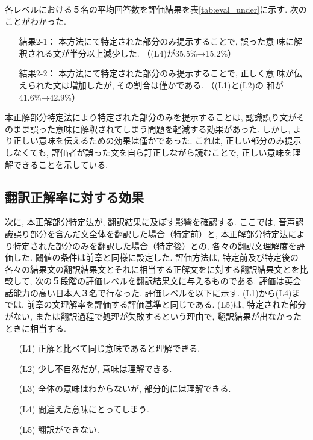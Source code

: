 各レベルにおける５名の平均回答数を評価結果を表\ref{tab:eval_under}に示す. 
次のことがわかった. 
\begin{itemize}
\item [　結果2-1：] 本方法にて特定された部分のみ提示することで, 誤った意
      味に解釈される文が半分以上減少した. （(L4)が35.5\%→15.2\%）
\item [　結果2-2：] 本方法にて特定された部分のみ提示することで, 正しく意
      味が伝えられた文は増加したが, その割合は僅かである. （(L1)と(L2)の
      和が41.6\%→42.9\%）
\end{itemize}

本正解部分特定法により特定された部分のみを提示することは, 認識誤り文がそのまま誤った意味に解釈されてしまう問題を軽減する効果があった. 
しかし, より正しい意味を伝えるための効果は僅かであった. 
これは, 正しい部分のみ提示しなくても, 評価者が誤った文を自ら訂正しながら読むことで, 正しい意味を理解できることを示している. 

\subsection{翻訳正解率に対する効果}

次に, 本正解部分特定法が, 翻訳結果に及ぼす影響を確認する. 
ここでは, 音声認識誤り部分を含んだ文全体を翻訳した場合（特定前）と, 本正解部分特定法により特定された部分のみを翻訳した場合（特定後）との, 各々の翻訳文理解度を評価した. 閾値の条件は前章と同様に設定した. 
評価方法は, 特定前及び特定後の各々の結果文の翻訳結果文とそれに相当する正解文をに対する翻訳結果文とを比較して, 次の５段階の評価レベルを翻訳結果文に与えるものである. 
評価は英会話能力の高い日本人３名で行なった. 評価レベルを以下に示す. (L1)から(L4)までは, 前章の文理解率を評価する評価基準と同じである. (L5)は, 特定された部分がない, または翻訳過程で処理が失敗するという理由で, 翻訳結果が出なかったときに相当する. 
\begin{itemize}
\item[　(L1)] 正解と比べて同じ意味であると理解できる. 
\vspace*{-2mm}
\item[　(L2)] 少し不自然だが, 意味は理解できる. 
\vspace*{-2mm}
\item[　(L3)] 全体の意味はわからないが, 部分的には理解できる. 
\vspace*{-2mm}
\item[　(L4)] 間違えた意味にとってしまう. 
\vspace*{-2mm}
\item[　(L5)] 翻訳ができない. 
\end{itemize}



